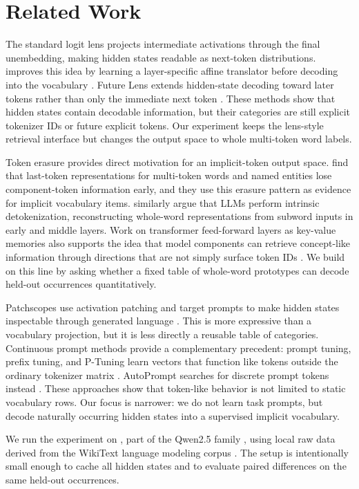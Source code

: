 \section{Related Work}
\label{sec:related}

The standard logit lens projects intermediate activations through the final unembedding, making hidden states readable as next-token distributions. \tunedlens improves this idea by learning a layer-specific affine translator before decoding into the vocabulary \citep{belrose2023eliciting}. Future Lens extends hidden-state decoding toward later tokens rather than only the immediate next token \citep{pal2023future}. These methods show that hidden states contain decodable information, but their categories are still explicit tokenizer IDs or future explicit tokens. Our experiment keeps the lens-style retrieval interface but changes the output space to whole multi-token word labels.

Token erasure provides direct motivation for an implicit-token output space. \citet{feucht2024token} find that last-token representations for multi-token words and named entities lose component-token information early, and they use this erasure pattern as evidence for implicit vocabulary items. \citet{kaplan2025tokens} similarly argue that LLMs perform intrinsic detokenization, reconstructing whole-word representations from subword inputs in early and middle layers. Work on transformer feed-forward layers as key-value memories also supports the idea that model components can retrieve concept-like information through directions that are not simply surface token IDs \citep{geva2021transformer}. We build on this line by asking whether a fixed table of whole-word prototypes can decode held-out occurrences quantitatively.

Patchscopes use activation patching and target prompts to make hidden states inspectable through generated language \citep{ghandeharioun2024patchscopes}. This is more expressive than a vocabulary projection, but it is less directly a reusable table of categories. Continuous prompt methods provide a complementary precedent: prompt tuning, prefix tuning, and P-Tuning learn vectors that function like tokens outside the ordinary tokenizer matrix \citep{lester2021power,li2021prefix,liu2022ptuning}. AutoPrompt searches for discrete prompt tokens instead \citep{shin2020autoprompt}. These approaches show that token-like behavior is not limited to static vocabulary rows. Our focus is narrower: we do not learn task prompts, but decode naturally occurring hidden states into a supervised implicit vocabulary.

We run the experiment on \qwen, part of the Qwen2.5 family \citep{qwen2025qwen25}, using local raw \wikitext data derived from the WikiText language modeling corpus \citep{merity2016pointer}. The setup is intentionally small enough to cache all hidden states and to evaluate paired differences on the same held-out occurrences.
